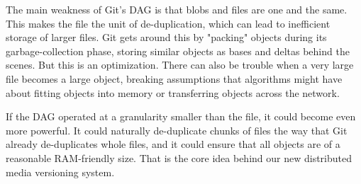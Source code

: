 The main weakness of Git's DAG is that blobs and files are one and the same.
This makes the file the unit of de-duplication, which can lead to inefficient
storage of larger files. Git gets around this by "packing" objects during its
garbage-collection phase, storing similar objects as bases and deltas behind the
scenes. But this is an optimization. There can also be trouble
when a very large file becomes a large object, breaking
assumptions that algorithms might have about fitting objects into memory
or transferring objects across the network.

If the DAG operated at a granularity smaller than the file, it could become even
more powerful. It could naturally de-duplicate chunks of files the way that Git
already de-duplicates whole files, and it could ensure that all objects are of a
reasonable RAM-friendly size. That is the core idea behind our new distributed
media versioning system.
